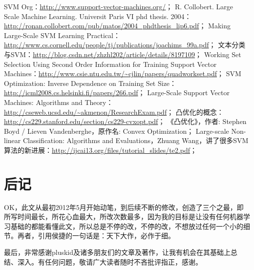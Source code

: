 \documentclass[a4paper,12pt]{article}
\begin{document}
\begin{thebibliography}{11}
\bibitem{}  SVM Org：\url{http://www.support-vector-machines.org/}；
\bibitem{}  R. Collobert. Large Scale Machine Learning. Universit Paris VI phd thesis. 2004：\url{http://ronan.collobert.com/pub/matos/2004_phdthesis_lip6.pdf}；
\bibitem{}  Making Large-Scale SVM Learning Practical：\url{http://www.cs.cornell.edu/people/tj/publications/joachims_99a.pdf}；
\bibitem{}  文本分类与SVM：\url{http://blog.csdn.net/zhzhl202/article/details/8197109}；
\bibitem{}  Working Set Selection Using Second Order Information
\bibitem{}  for Training Support Vector Machines：\url{http://www.csie.ntu.edu.tw/~cjlin/papers/quadworkset.pdf}；
\bibitem{}  SVM Optimization: Inverse Dependence on Training Set Size：\url{http://icml2008.cs.helsinki.fi/papers/266.pdf}；
\bibitem{}  Large-Scale Support Vector Machines: Algorithms and Theory：\url{http://cseweb.ucsd.edu/~akmenon/ResearchExam.pdf}；
\bibitem{}  凸优化的概念：\url{http://cs229.stanford.edu/section/cs229-cvxopt.pdf}；
\bibitem{}  《凸优化》，作者: Stephen Boyd / Lieven Vandenberghe，原作名: Convex Optimization；
\bibitem{}  Large-scale Non-linear Classification: Algorithms and Evaluations，Zhuang Wang，讲了很多SVM算法的新进展：\url{http://ijcai13.org/files/tutorial_slides/te2.pdf}；
\end{thebibliography}

\section*{后记}
 OK，此文从最初2012年5月开始动笔，到后续不断的修改，创造了三个之最，即所写时间最长，所花心血最大，所改次数最多，因为我的目标是让没有任何机器学习基础的都能看懂此文，所以总是不停的改，不停的改，不想放过任何一个小的细节。再者，引用侯捷的一句话是：天下大作，必作于细。

 最后，非常感谢pluskid及诸多朋友们的文章及著作，让我有机会在其基础上总结、深入。有任何问题，敬请广大读者随时不吝批评指正，感谢。
\end{document}
